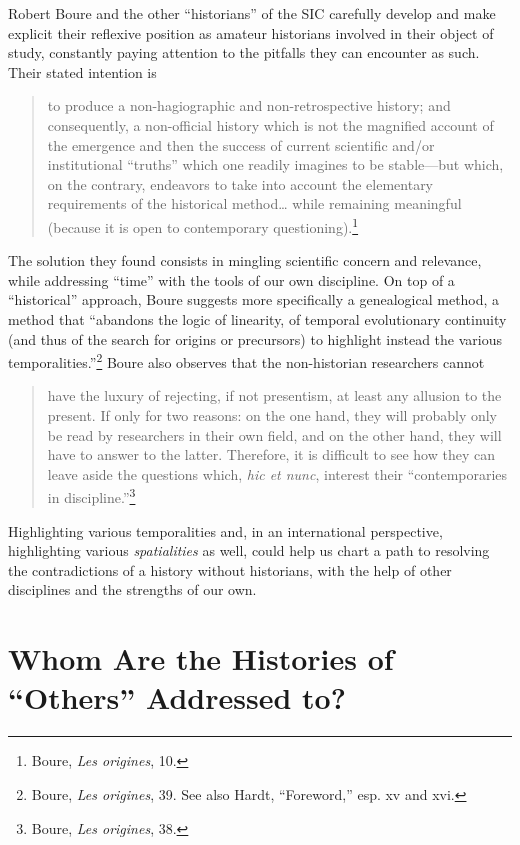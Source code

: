 \documentclass{tufte-handout}
\begin{document}
Robert Boure and the other ``historians'' of the SIC carefully develop
and make explicit their reflexive position as amateur historians
involved in their object of study, constantly paying attention to the
pitfalls they can encounter as such. Their stated intention is

\begin{quote}
to produce a non-hagiographic and non-retrospective history; and
consequently, a non-official history which is not the magnified account
of the emergence and then the success of current scientific and/or
institutional ``truths'' which one readily imagines to be stable---but
which, on the contrary, endeavors to take into account the elementary
requirements of the historical method\ldots{} while remaining meaningful
(because it is open to contemporary
questioning).\footnote{Boure, \emph{Les origines}, 10.
}
\end{quote}

The solution they found consists in mingling scientific concern and
relevance, while addressing ``time'' with the tools of our own
discipline. On top of a ``historical'' approach, Boure suggests more
specifically a genealogical method, a method that ``abandons the logic
of linearity, of temporal evolutionary continuity (and thus of the
search for origins or precursors) to highlight instead the various
temporalities.''\footnote{Boure, \emph{Les origines}, 39. See also Hardt, ``Foreword,'' esp. xv
  and xvi.
} Boure also
observes that the non-historian researchers cannot

\begin{quote}
have the luxury of rejecting, if not presentism, at least any allusion
to the present. If only for two reasons: on the one hand, they will
probably only be read by researchers in their own field, and on the
other hand, they will have to answer to the latter. Therefore, it is
difficult to see how they can leave aside the questions which, \emph{hic
et nunc}, interest their ``contemporaries in
discipline.''\footnote{Boure, \emph{Les origines}, 38.
}
\end{quote}

\noindent Highlighting various temporalities and, in an international perspective,
highlighting various \emph{spatialities} as well, could help us chart a
path to resolving the contradictions of a history without historians,
with the help of other disciplines and the strengths of our own.

\hypertarget{whom-are-the-histories-of-others-addressed-to}{%
\section{Whom Are the Histories of ``Others'' Addressed
to?}\label{whom-are-the-histories-of-others-addressed-to}}
\end{document}
